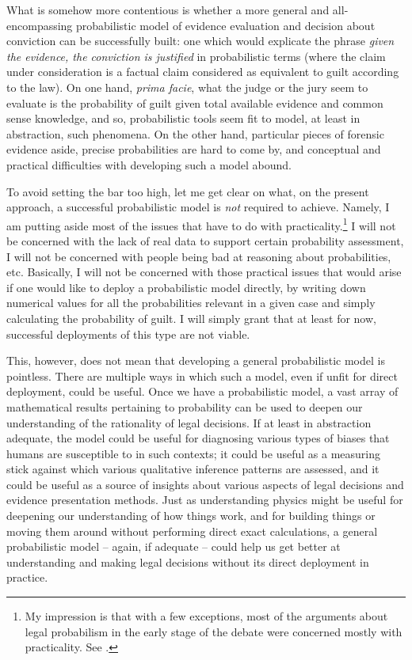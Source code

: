 \documentclass{ifcolog}
\begin{document}
What is somehow more contentious is whether a more general and all-en\-com\-pass\-ing probabilistic model of evidence evaluation and decision about conviction can be successfully built: one which would explicate the phrase \emph{given the evidence, the conviction is justified} in probabilistic terms (where the claim under consideration is a factual claim considered as equivalent to guilt according to the law).  On one hand, \emph{prima facie}, what the judge or the jury seem to evaluate is the probability of guilt given total available evidence and common sense knowledge, and so, probabilistic tools  seem fit to model, at least in abstraction, such phenomena. On the other hand, particular pieces of forensic evidence aside, precise probabilities are hard to come by, and conceptual and practical difficulties with developing such a model abound. 




To avoid setting the bar too high, let me get clear on what, on the present approach, a successful probabilistic model is \emph{not} required to achieve. Namely, I am  putting aside most of the issues that have to do with practicality.\footnote{My impression is that with a few exceptions, most of the arguments about legal probabilism in the early stage of the debate were concerned mostly with practicality. See   \citep{ball1960moment,kaplan1968decision,cullison1969probability,simon1970quantifying, tribe1971trial,tribe1970further,lempert1977modeling,kaye1979paradox,tillers1988probability}.}  I will not be concerned with the lack of real data to support certain probability assessment, I will not be concerned with people being bad at reasoning about probabilities, etc. Basically, I will not be concerned with those practical issues that would arise if one would like to deploy a probabilistic model directly, by writing down numerical values for all the probabilities relevant in a given case and simply calculating the probability of guilt. I will simply grant that at least for now,  successful deployments of  this type  are not viable.

This, however, does not mean that developing a general probabilistic model is pointless. There are multiple ways in which such a model, even if unfit for direct deployment, could be useful.  Once we have a probabilistic model, a vast array of mathematical results pertaining to probability can be used to deepen our understanding of the rationality of legal decisions. If at least in abstraction  adequate, the model  could be useful for diagnosing various types of biases that humans are susceptible to in such contexts; it could be useful as a measuring stick against which various qualitative inference patterns are assessed, and it could be useful as a source of insights about various aspects of legal decisions and evidence presentation methods. Just as understanding physics might be useful for deepening our understanding of how things work, and for building things or moving them around without performing direct exact calculations, a general probabilistic model -- again, if adequate -- could help us get better at understanding and  making legal decisions without its direct deployment in practice.  
\end{document}
